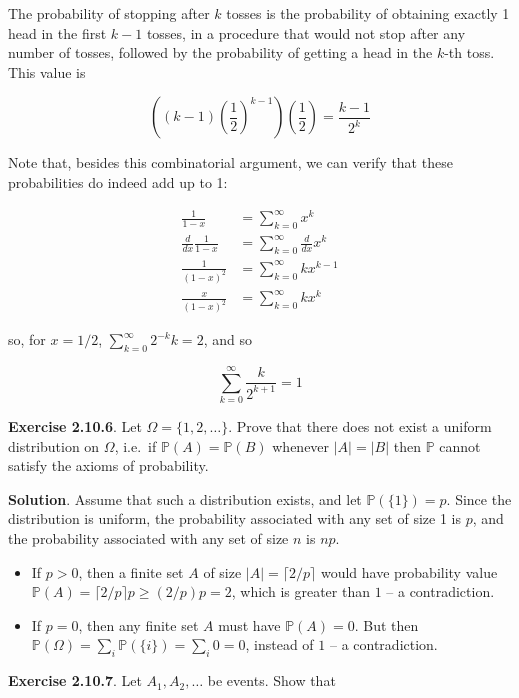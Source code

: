 The probability of stopping after \(k\) tosses is the probability of
obtaining exactly 1 head in the first \(k - 1\) tosses, in a procedure
that would not stop after any number of tosses, followed by the
probability of getting a head in the \(k\)-th toss. This value is

\[ \left((k-1) \left(\frac{1}{2}\right)^{k - 1} \right) \left(\frac{1}{2}\right) = \frac{k - 1}{2^k}\]

Note that, besides this combinatorial argument, we can verify that these
probabilities do indeed add up to 1:

\begin{align}
\frac{1}{1 - x} &= \sum_{k = 0}^\infty x^k \\
\frac{d}{dx} \frac{1}{1 - x} &= \sum_{k = 0}^\infty \frac{d}{dx} x^k \\
\frac{1}{(1 - x)^2} &= \sum_{k = 0}^\infty k x^{k - 1} \\
\frac{x}{(1 - x)^2} &= \sum_{k = 0}^\infty k x^k 
\end{align}

so, for \(x = 1/2\), \(\sum_{k = 0}^\infty 2^{-k} k = 2\), and so

\[ \sum_{k = 0}^\infty \frac{k}{2^{k + 1}} = 1 \]

\textbf{Exercise 2.10.6}. Let \(\Omega = \{1, 2, \dots\}\). Prove that
there does not exist a uniform distribution on \(\Omega\), i.e.~if
\(\mathbb{P}(A)  =\mathbb{P}(B)\) whenever \(|A| = |B|\) then
\(\mathbb{P}\) cannot satisfy the axioms of probability.

\textbf{Solution}. Assume that such a distribution exists, and let
\(\mathbb{P}(\{1\}) = p\). Since the distribution is uniform, the
probability associated with any set of size 1 is \(p\), and the
probability associated with any set of size \(n\) is \(np\).

\begin{itemize}
\item
  If \(p > 0\), then a finite set \(A\) of size
  \(|A| = \lceil 2 / p \rceil\) would have probability value
  \(\mathbb{P}(A) = \lceil 2 / p \rceil p \geq (2 / p) p = 2\), which is
  greater than \(1\) -- a contradiction.
\item
  If \(p = 0\), then any finite set \(A\) must have
  \(\mathbb{P}(A) = 0\). But then
  \(\mathbb{P}(\Omega) = \sum_i \mathbb{P}(\{ i \}) = \sum_i 0 = 0\),
  instead of \(1\) -- a contradiction.
\end{itemize}

\textbf{Exercise 2.10.7}. Let \(A_1, A_2, \dots\) be events. Show that

